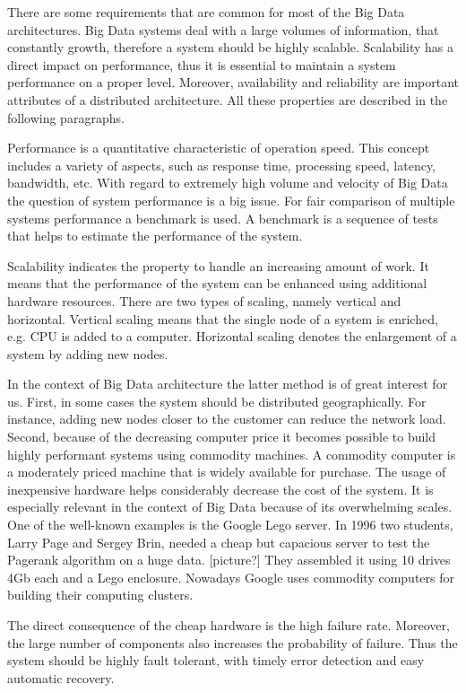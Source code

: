 There are some requirements that are common for most of the Big Data architectures.
Big Data systems deal with a large volumes of information, that constantly growth, therefore a system should be highly scalable.
Scalability has a direct impact on performance, thus it is essential to maintain a system performance on a proper level.
Moreover, availability and reliability are important attributes of a distributed architecture.
All these properties are described in the following paragraphs.

Performance is a quantitative characteristic of operation speed.  
This concept includes a variety of aspects, such as response time, processing speed, latency, bandwidth, etc.
With regard to extremely high volume and velocity of Big Data the question of system performance is a big issue.
For fair comparison of multiple systems performance a benchmark is used.
A benchmark is a sequence of tests that helps to estimate the performance of the system.

Scalability indicates the property to handle an increasing amount of work.
It means that the performance of the system can be enhanced using additional hardware resources.
There are two types of scaling, namely vertical and horizontal.
Vertical scaling means that the single node of a system is enriched, e.g. CPU is added to a computer. 
Horizontal scaling denotes the enlargement of a system by adding new nodes.

In the context of Big Data architecture the latter method is of great interest for us.
First, in some cases the system should be distributed geographically.
For instance, adding new nodes closer to the customer can reduce the network load.
Second, because of the decreasing computer price it becomes possible to build highly performant systems using commodity machines.
A commodity computer is a moderately priced machine that is widely available for purchase.
The usage of inexpensive hardware helps considerably decrease the cost of the system.
It is especially relevant in the context of Big Data because of its overwhelming scales.
One of the well-known examples is the Google Lego server.
In 1996 two students, Larry Page and Sergey Brin, needed a cheap but capacious server to test the Pagerank algorithm on a huge data. 
[picture?]
They assembled it using 10 drives 4Gb each and a Lego enclosure. 
Nowadays Google uses commodity computers for building their computing clusters.

The direct consequence of the cheap hardware is the high failure rate.
Moreover, the large number of components also increases the probability of failure. 
Thus the system should be highly fault tolerant, with timely error detection and easy automatic recovery.

